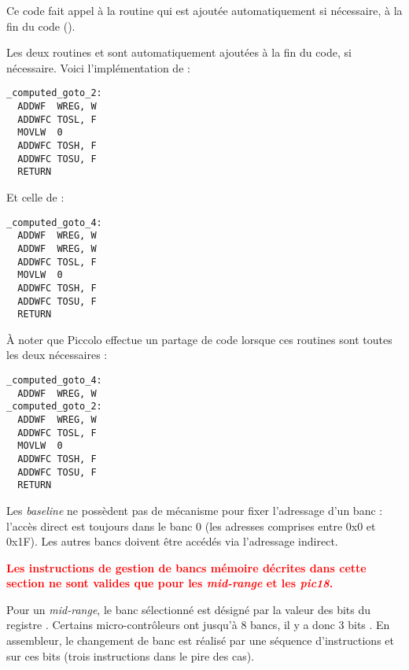 Ce code fait appel à la routine  qui est ajoutée automatiquement si nécessaire, à la fin du code (). 





Les deux routines  et  sont automatiquement ajoutées à la fin du code, si nécessaire. Voici l'implémentation de  :
\begin{lstlisting}[language=assembleur]
_computed_goto_2:
  ADDWF  WREG, W
  ADDWFC TOSL, F
  MOVLW  0
  ADDWFC TOSH, F
  ADDWFC TOSU, F
  RETURN
\end{lstlisting}

Et celle de  :
\begin{lstlisting}[language=assembleur]
_computed_goto_4:
  ADDWF  WREG, W
  ADDWF  WREG, W
  ADDWFC TOSL, F
  MOVLW  0
  ADDWFC TOSH, F
  ADDWFC TOSU, F
  RETURN
\end{lstlisting}

À noter que Piccolo effectue un partage de code lorsque ces routines sont toutes les deux nécessaires :
\begin{lstlisting}[language=assembleur]
_computed_goto_4:
  ADDWF  WREG, W
_computed_goto_2:
  ADDWF  WREG, W
  ADDWFC TOSL, F
  MOVLW  0
  ADDWFC TOSH, F
  ADDWFC TOSU, F
  RETURN
\end{lstlisting}













Les \emph{baseline} ne possèdent pas de mécanisme pour fixer l'adressage d'un banc : l'accès direct est toujours dans le banc 0 (les adresses comprises entre 0x0 et 0x1F). Les autres bancs doivent être accédés via l'adressage indirect.

\textcolor{red}{\bf Les instructions de gestion de bancs mémoire décrites dans cette section ne sont valides que pour les \emph{mid-range} et les \emph{pic18}.}

Pour un \emph{mid-range}, le banc sélectionné est désigné par la valeur des bits  du registre . Certains micro-contrôleurs ont jusqu'à 8 bancs, il y a donc 3 bits . En assembleur, le changement de banc est réalisé par une séquence d'instructions  et  sur ces bits (trois instructions dans le pire des cas). 


